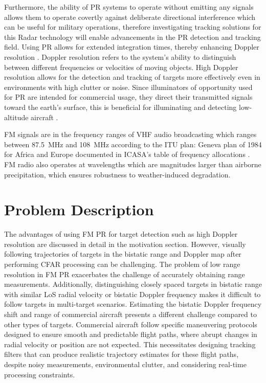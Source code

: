 Furthermore, the ability of \ac{PR} systems to operate without emitting any signals allows them to operate covertly against deliberate directional interference which can be useful for military operations, therefore investigating tracking solutions for this \ac{Radar} technology will enable advancements in the \ac{PR} detection and tracking field. Using \ac{PR} allows for extended integration times, thereby enhancing Doppler resolution \cite{De2015}. Doppler resolution refers to the system's ability to distinguish between different frequencies or velocities of moving objects. High Doppler resolution allows for the detection and tracking of targets more effectively even in environments with high clutter or noise. Since illuminators of opportunity used for \ac{PR} are intended for commercial usage, they direct their transmitted signals toward the earth's surface, this is beneficial for illuminating and detecting low-altitude aircraft \cite{Herman2002}.

\ac{FM} signals are in the frequency ranges of \ac{VHF} audio broadcasting which ranges between 87.5\, MHz and 108\, MHz according to the \ac{ITU} plan: Geneva plan of 1984 for Africa and Europe documented in \ac{ICASA}'s table of frequency allocations \cite{Frequency2008}. \ac{FM} radio also operates at wavelengths which are magnitudes larger than airborne precipitation, which ensures robustness to weather-induced degradation.


\section{Problem Description}
The advantages of using \ac{FM} \ac{PR} for target detection such as high Doppler resolution are discussed in detail in the motivation section. However, visually following trajectories of targets in the bistatic range and Doppler map after performing \ac{CFAR} processing can be challenging. The problem of low range resolution in \ac{FM} \ac{PR} exacerbates the challenge of accurately obtaining range measurements. Additionally, distinguishing closely spaced targets in bistatic range with similar \ac{LoS} radial velocity or bistatic Doppler frequency makes it difficult to follow targets in multi-target scenarios. Estimating the bistatic Doppler frequency shift and range of commercial aircraft presents a different challenge compared to other types of targets. Commercial aircraft follow specific maneuvering protocols designed to ensure smooth and predictable flight paths, where abrupt changes in radial velocity or position are not expected. This necessitates designing tracking filters that can produce realistic trajectory estimates for these flight paths, despite noisy measurements, environmental clutter, and considering real-time processing constraints.

